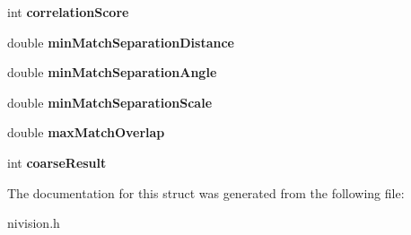 \begin{DoxyCompactItemize}
\item 
\hypertarget{structMatchGeometricPatternAdvancedOptions__struct_accfd9c131880eb372c43eeef695a8107}{
int {\bfseries correlationScore}}
\label{structMatchGeometricPatternAdvancedOptions__struct_accfd9c131880eb372c43eeef695a8107}

\item 
\hypertarget{structMatchGeometricPatternAdvancedOptions__struct_a0811b0bde6155c77d1e744028c502820}{
double {\bfseries minMatchSeparationDistance}}
\label{structMatchGeometricPatternAdvancedOptions__struct_a0811b0bde6155c77d1e744028c502820}

\item 
\hypertarget{structMatchGeometricPatternAdvancedOptions__struct_a246b926988f26ae32bc09e37340f5ed9}{
double {\bfseries minMatchSeparationAngle}}
\label{structMatchGeometricPatternAdvancedOptions__struct_a246b926988f26ae32bc09e37340f5ed9}

\item 
\hypertarget{structMatchGeometricPatternAdvancedOptions__struct_a9984cae75cea1ad7fc8a88369880f4f2}{
double {\bfseries minMatchSeparationScale}}
\label{structMatchGeometricPatternAdvancedOptions__struct_a9984cae75cea1ad7fc8a88369880f4f2}

\item 
\hypertarget{structMatchGeometricPatternAdvancedOptions__struct_ad86fa5208c7176daff50428394e0fbdd}{
double {\bfseries maxMatchOverlap}}
\label{structMatchGeometricPatternAdvancedOptions__struct_ad86fa5208c7176daff50428394e0fbdd}

\item 
\hypertarget{structMatchGeometricPatternAdvancedOptions__struct_a59dcbe2cc45d6f9dfeed4f0fa463d6d6}{
int {\bfseries coarseResult}}
\label{structMatchGeometricPatternAdvancedOptions__struct_a59dcbe2cc45d6f9dfeed4f0fa463d6d6}

\end{DoxyCompactItemize}


The documentation for this struct was generated from the following file:\begin{DoxyCompactItemize}
\item 
nivision.h\end{DoxyCompactItemize}
